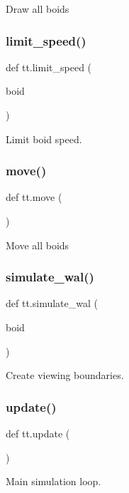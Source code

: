 \begin{DoxyVerb}Draw all boids\end{DoxyVerb}
 \mbox{\label{namespacett_afc13ee1aa227adfb8fe4d57a0237ab6a}} 
\subsubsection{\texorpdfstring{limit\+\_\+speed()}{limit\_speed()}}
{\footnotesize\ttfamily def tt.\+limit\+\_\+speed (\begin{DoxyParamCaption}\item[{}]{boid }\end{DoxyParamCaption})}

\begin{DoxyVerb}Limit boid speed.\end{DoxyVerb}
 \mbox{\label{namespacett_a958094ad0575c8ccce295d919f0a52ff}} 
\subsubsection{\texorpdfstring{move()}{move()}}
{\footnotesize\ttfamily def tt.\+move (\begin{DoxyParamCaption}{ }\end{DoxyParamCaption})}

\begin{DoxyVerb}Move all boids\end{DoxyVerb}
 \mbox{\label{namespacett_a67daab86030bfe298b96882772167b9d}} 
\subsubsection{\texorpdfstring{simulate\+\_\+wal()}{simulate\_wal()}}
{\footnotesize\ttfamily def tt.\+simulate\+\_\+wal (\begin{DoxyParamCaption}\item[{}]{boid }\end{DoxyParamCaption})}

\begin{DoxyVerb}Create viewing boundaries.\end{DoxyVerb}
 \mbox{\label{namespacett_a7bdfd42cb1d13da52111a5be9b2d255b}} 
\subsubsection{\texorpdfstring{update()}{update()}}
{\footnotesize\ttfamily def tt.\+update (\begin{DoxyParamCaption}{ }\end{DoxyParamCaption})}

\begin{DoxyVerb}Main simulation loop.\end{DoxyVerb}
 